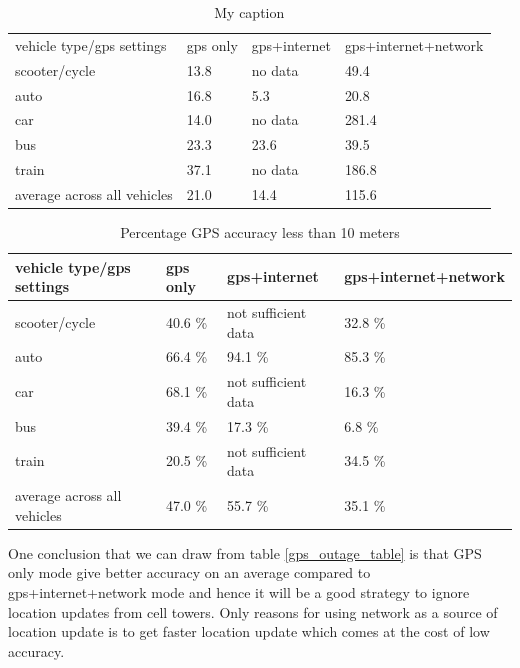 \documentclass[12pt]{report}
\begin{document}
\begin{table}[]
  \centering
  \caption{My caption}
  \label{my-label}
  \begin{tabular}{llll}
    vehicle type/gps settings   & gps only & gps+internet & gps+internet+network \\
    scooter/cycle               & 13.8     & no data      & 49.4                 \\
    auto                        & 16.8     & 5.3          & 20.8                 \\
    car                         & 14.0     & no data      & 281.4                \\
    bus                         & 23.3     & 23.6         & 39.5                 \\
    train                       & 37.1     & no data      & 186.8                \\
    average across all vehicles & 21.0     & 14.4         & 115.6               
  \end{tabular}
\end{table}

 
 \begin{table}[h!]
   \centering
   \caption{Percentage GPS accuracy less than 10 meters}
   \label{gps_accuracy_table}
   \begin{tabular}{l|lll}
     vehicle type/gps settings   & gps only & gps+internet                  &
                                                                              gps+internet+network \\ \hline
     scooter/cycle               & 40.6 \%   & not sufficient data           & 32.8 \%                \\
     auto                        & 66.4 \%   & 94.1 \%                         & 85.3 \%                \\
     car                         & 68.1 \%   & not sufficient data  & 16.3 \%                \\
     bus                         & 39.4 \%   & 17.3  \%                        & 6.8  \%                \\
     train                       & 20.5 \%   & not sufficient data           & 34.5 \%                \\
     average across all vehicles & 47.0 \%   & 55.7   \%                       & 35.1 \%               
   \end{tabular}
 \end{table}
 One conclusion that we can draw from table \ref{gps_outage_table} is that GPS
 only mode give better accuracy on an average compared to gps+internet+network
 mode and hence it will be a good strategy to ignore location updates from cell
 towers. Only reasons for using network as a source of location update is to get
 faster location update which comes at the cost of low accuracy.
\end{document}
